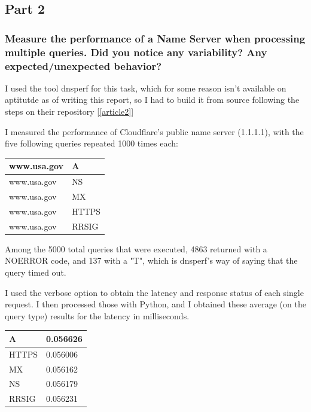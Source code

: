 \documentclass[a4paper,10pt]{article}
\begin{document}
\subsection{Part 2}


\subsubsection{Measure the performance of a Name Server when processing multiple queries. 
Did you notice any variability? Any expected/unexpected behavior?}


I used the tool dnsperf for this task, which for some reason isn't available on aptitutde as of writing this report, so I had to build it from source following the steps on their repository [\ref{article2}]


I measured the performance of Cloudflare's public name server (1.1.1.1), with the five following queries repeated 1000 times each:

\begin{table}[h!]
\centering
\begin{tabular}{|l|l|}
\hline
www.usa.gov & A     \\ \hline
www.usa.gov & NS    \\ \hline
www.usa.gov & MX    \\ \hline
www.usa.gov & HTTPS \\ \hline
www.usa.gov & RRSIG \\ \hline
\end{tabular}
\end{table}


Among the 5000 total queries that were executed,  4863 returned with a NOERROR code, and 137 with a "T", which is dnsperf's way of saying that the query timed out.


I used the verbose option to obtain the latency and response status of each single request. I then processed those with Python, and I obtained these average (on the query type) results for the latency in milliseconds. 

\begin{table}[h!]
\centering
\begin{tabular}{|l|l|}
\hline
A     & 0.056626 \\ \hline
HTTPS & 0.056006 \\ \hline
MX    & 0.056162 \\ \hline
NS    & 0.056179 \\ \hline
RRSIG & 0.056231 \\ \hline
\end{tabular}
\end{table}
\end{document}
